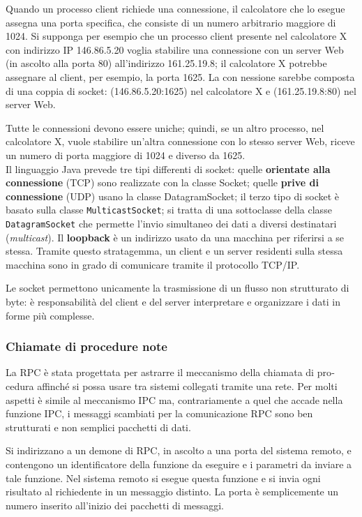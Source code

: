 \documentclass[11pt,a4paper]{article}
\begin{document}
Quando un processo client richiede una connessione, il calcolatore che lo esegue asse­gna una porta specifica, che consiste di un numero arbitrario maggiore di 1024.
Si supponga
per esempio che un processo client presente nel calcolatore X con indirizzo IP 146.86.5.20
voglia stabilire una connessione con un server Web (in ascolto alla porta 80) all'indirizzo
161.25.19.8; il calcolatore X potrebbe assegnare al client, per esempio, la porta 1625. La con­
nessione sarebbe composta di una coppia di socket: (146.86.5.20:1625) nel calcolatore X e
(161.25.19.8:80) nel server Web.

Tutte le connessioni devono essere uniche; quindi, se un altro processo, nel calcolato­re X, vuole stabilire un'altra connessione con lo stesso server Web, riceve un numero di por­ta maggiore di 1024 e diverso da 1625.
\medskip\\
Il linguaggio Java prevede tre tipi differenti di socket: quelle \textbf{orientate alla connessio­ne} (TCP) sono realizzate con la classe Socket; quelle \textbf{prive di connessione} (UDP) usano la
classe DatagramSocket; il terzo tipo di socket è basato sulla classe \texttt{MulticastSocket}; si
tratta di una sottoclasse della classe \texttt{DatagramSocket} che permette l'invio simultaneo dei
dati a diversi destinatari (\emph{multicast}).
Il \textbf{loopback} è un indirizzo usato da una macchina per riferirsi a se stessa. Tramite questo stratagemma, un client e un server residenti sulla stessa macchina sono
in grado di comunicare tramite il protocollo TCP/IP.

Le socket permettono unica­mente la trasmissione di un flusso non strutturato di byte: è responsabilità del client e del
server interpretare e organizzare i dati in forme più complesse.

\subsubsection{Chiamate di procedure note}
La RPC è stata progettata per astrarre il meccanismo della chiamata di pro­cedura affinché si possa usare tra sistemi collegati tramite una rete. Per molti aspetti è simile al
meccanismo IPC ma, contrariamente a quel che accade nella funzione IPC, i messaggi scambiati per la co­municazione RPC sono ben strutturati e non semplici pacchetti di dati.

Si indirizzano a un de­mone di RPC, in ascolto a una porta del sistema remoto, e contengono un identificatore della funzione da eseguire e i parametri da inviare a tale funzione. Nel sistema remoto si esegue que­sta funzione e si invia ogni risultato al richiedente in un messaggio distinto.
La porta è semplicemente un numero inserito all'inizio dei pacchetti di messaggi.
\end{document}
